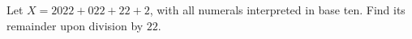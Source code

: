 Let $X=2022+022+22+2$, with all numerals interpreted in base ten. Find its remainder upon division by $22$.
